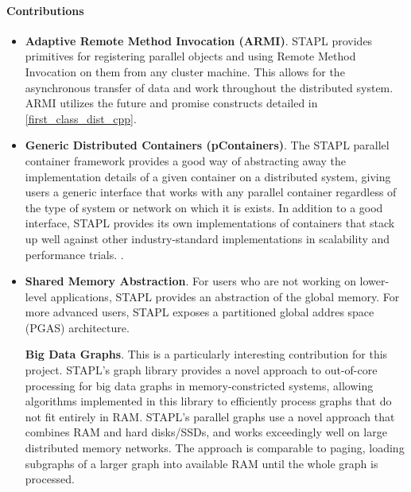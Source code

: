 \paragraph{Contributions} 
\begin{itemize}
	\item
		\textbf{Adaptive Remote Method Invocation (ARMI)}. STAPL provides primitives for registering parallel objects and using Remote Method Invocation on them from any cluster machine. This allows for the asynchronous transfer of data and work throughout the distributed system.  ARMI utilizes the future and promise constructs detailed in \ref{first_class_dist_cpp}. 
	\item
		\textbf{Generic Distributed Containers (pContainers)}. The STAPL parallel container framework provides a good way of abstracting away the implementation details of a given container on a distributed system, giving users a generic interface that works with any parallel container regardless of the type of system or network on which it is exists. In addition to a good interface, STAPL provides its own implementations of containers that stack up well against other industry-standard implementations in scalability and performance trials. \cite{stapl_parallel_container}.	
	\item
		\textbf{Shared Memory Abstraction}. For users who are not working on lower-level applications, STAPL provides an abstraction of the global memory. For more advanced users, STAPL exposes a partitioned global addres space (PGAS) architecture. 

		\textbf{Big Data Graphs}. This is a particularly interesting contribution for this project. STAPL's graph library \cite{stapl_graph} provides a novel approach to out-of-core processing for big data graphs in memory-constricted systems, allowing algorithms implemented in this library to efficiently process graphs that do not fit entirely in RAM. STAPL's parallel graphs use a novel approach that combines RAM and hard disks/SSDs, and works exceedingly well on large distributed memory networks. The approach is comparable to paging, loading subgraphs of a larger graph into available RAM until the whole graph is processed. 
\end{itemize}

